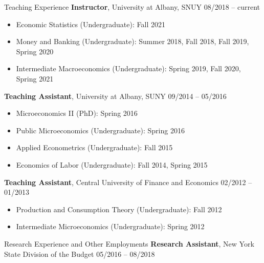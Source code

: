 \documentclass{resume_liang} %
\begin{document}
\begin{rSection}{Teaching Experience}
{\bf Instructor}{, University at Albany, SNUY} \hfill { 08/2018 -- current}
 \begin{itemize}
 	 \item[] Economic Statistics (Undergraduate): Fall 2021
     \item[] Money and Banking (Undergraduate): Summer 2018, Fall 2018, Fall 2019, Spring 2020
     \item[] Intermediate Macroeconomics (Undergraduate): Spring 2019, Fall 2020, Spring 2021
 \end{itemize} 
{\bf Teaching Assistant}{, University at Albany, SUNY} \hfill {09/2014 -- 05/2016}
   \begin{itemize}
     \item[] Microeconomics II (PhD): Spring 2016
     \item[] Public Microeconomics (Undergraduate): Spring 2016
     \item[] Applied Econometrics (Undergraduate): Fall 2015
     \item[] Economics of Labor (Undergraduate): Fall 2014, Spring 2015
   \end{itemize} 
{\bf Teaching Assistant}{, Central University of Finance and Economics} \hfill {02/2012 -- 01/2013}
\begin{itemize}
	\item[] Production and Consumption Theory (Undergraduate): Fall 2012
	\item[] Intermediate Microeconomics (Undergraduate): Spring 2012 
\end{itemize} 
\vspace{0.2cm}
\end{rSection}
\bigskip  




\begin{rSection}{Research Experience and Other Employments}
{\bf Research Assistant}{, New York State Division of the Budget} \hfill {05/2016 -- 08/2018}
\\
\end{rSection}
\bigskip  
\end{document}
